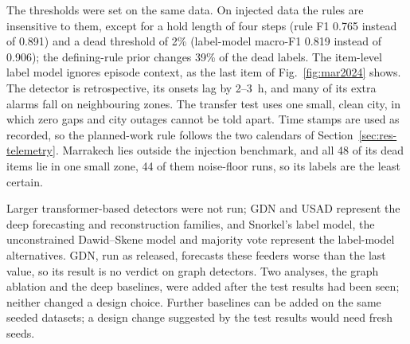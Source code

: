 The thresholds were set on the same data. On injected data the rules are insensitive to them, except for a hold length of four steps (rule F1 0.765 instead of 0.891) and a dead threshold of 2\% (label-model macro-F1 0.819 instead of 0.906); the defining-rule prior changes 39\% of the dead labels. The item-level label model ignores episode context, as the last item of Fig.~\ref{fig:mar2024} shows. The detector is retrospective, its onsets lag by 2--3~h, and many of its extra alarms fall on neighbouring zones. The transfer test uses one small, clean city, in which zero gaps and city outages cannot be told apart. Time stamps are used as recorded, so the planned-work rule follows the two calendars of Section~\ref{sec:res-telemetry}. Marrakech lies outside the injection benchmark, and all 48 of its dead items lie in one small zone, 44 of them noise-floor runs, so its labels are the least certain.

Larger transformer-based detectors were not run; GDN and USAD represent the deep forecasting and reconstruction families, and Snorkel's label model, the unconstrained Dawid--Skene model and majority vote represent the label-model alternatives. GDN, run as released, forecasts these feeders worse than the last value, so its result is no verdict on graph detectors. Two analyses, the graph ablation and the deep baselines, were added after the test results had been seen; neither changed a design choice. Further baselines can be added on the same seeded datasets; a design change suggested by the test results would need fresh seeds.
